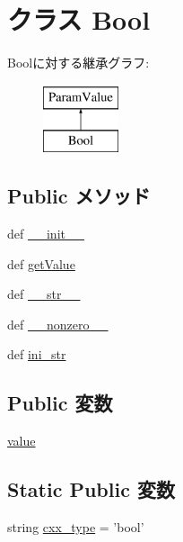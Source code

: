 \hypertarget{classm5_1_1params_1_1Bool}{
\section{クラス Bool}
\label{classm5_1_1params_1_1Bool}
}
Boolに対する継承グラフ:\begin{figure}[H]
\begin{center}
\leavevmode
\includegraphics[height=2cm]{classm5_1_1params_1_1Bool}
\end{center}
\end{figure}
\subsection*{Public メソッド}
\begin{DoxyCompactItemize}
\item 
def \hyperlink{classm5_1_1params_1_1Bool_ac775ee34451fdfa742b318538164070e}{\_\-\_\-init\_\-\_\-}
\item 
def \hyperlink{classm5_1_1params_1_1Bool_acc340fbd4335fa34f9d57fb454b28ed0}{getValue}
\item 
def \hyperlink{classm5_1_1params_1_1Bool_aa7a4b9bc0941308e362738503137460e}{\_\-\_\-str\_\-\_\-}
\item 
def \hyperlink{classm5_1_1params_1_1Bool_a14f4a7f4cbfde7254adc73da3b2de9a5}{\_\-\_\-nonzero\_\-\_\-}
\item 
def \hyperlink{classm5_1_1params_1_1Bool_a33ebe6cd32bcbd15465fc28b9d94bf82}{ini\_\-str}
\end{DoxyCompactItemize}
\subsection*{Public 変数}
\begin{DoxyCompactItemize}
\item 
\hyperlink{classm5_1_1params_1_1Bool_afcc7a4b78ecd8fa7e713f8cfa0f51017}{value}
\end{DoxyCompactItemize}
\subsection*{Static Public 変数}
\begin{DoxyCompactItemize}
\item 
string \hyperlink{classm5_1_1params_1_1Bool_a2f1553ebb79374a68b36fdd6d8d82fc3}{cxx\_\-type} = 'bool'
\end{DoxyCompactItemize}


